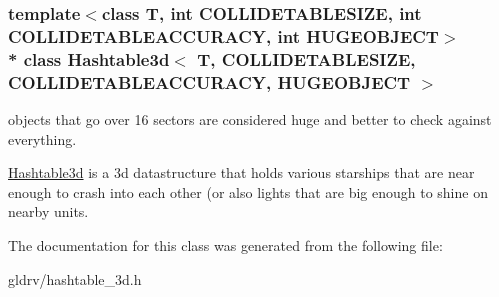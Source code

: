 \subsubsection*{template$<$class T, int C\+O\+L\+L\+I\+D\+E\+T\+A\+B\+L\+E\+S\+I\+ZE, int C\+O\+L\+L\+I\+D\+E\+T\+A\+B\+L\+E\+A\+C\+C\+U\+R\+A\+CY, int H\+U\+G\+E\+O\+B\+J\+E\+CT$>$\\*
class Hashtable3d$<$ T, C\+O\+L\+L\+I\+D\+E\+T\+A\+B\+L\+E\+S\+I\+Z\+E, C\+O\+L\+L\+I\+D\+E\+T\+A\+B\+L\+E\+A\+C\+C\+U\+R\+A\+C\+Y, H\+U\+G\+E\+O\+B\+J\+E\+C\+T $>$}

objects that go over 16 sectors are considered huge and better to check against everything. 

\hyperlink{classHashtable3d}{Hashtable3d} is a 3d datastructure that holds various starships that are near enough to crash into each other (or also lights that are big enough to shine on nearby units. 

The documentation for this class was generated from the following file\+:\begin{DoxyCompactItemize}
\item 
gldrv/hashtable\+\_\+3d.\+h\end{DoxyCompactItemize}
